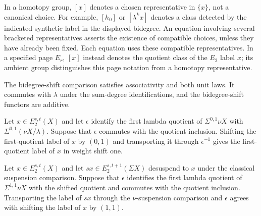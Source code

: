 In a homotopy group, $[x]$ denotes a chosen representative in $\{x\}$,
not a canonical choice. For example, $[h_0]$ or $[\lambda^kx]$ denotes a
class detected by the indicated synthetic label in the displayed
bidegree. An equation involving several bracketed representatives
asserts the existence of compatible choices, unless they have already
been fixed. Each equation uses these compatible representatives. In a specified page $E_r$, $[x]$ instead denotes the
quotient class of the $E_2$ label $x$; its ambient group distinguishes
this page notation from a homotopy representative.


\begin{theorem}
\label{sem:AdamsSynthetic:shift-coherence}
The bidegree-shift comparison satisfies associativity and both unit laws. It commutes with $\lambda$ under the sum-degree identifications, and the bidegree-shift functors are additive.
\end{theorem}

\begin{theorem}
\label{sem:AdamsSynthetic:first-quotient-shifts}
\label{sem:AdamsSynthetic:first-quotient-positive-weight-shift}
Let $x\in E_2^{s,t}(X)$ and let $\epsilon$ identify the first lambda quotient of $\Sigma^{0,1}\nu X$ with $\Sigma^{0,1}(\nu X/\lambda)$. Suppose that $\epsilon$ commutes with the quotient inclusion. Shifting the first-quotient label of $x$ by $(0,1)$ and transporting it through $\epsilon^{-1}$ gives the first-quotient label of $x$ in weight shift one.

\label{sem:AdamsSynthetic:first-quotient-classical-suspension}
Let $x\in E_2^{s,t}(X)$ and let $sx\in E_2^{s,t+1}(\Sigma X)$ desuspend to $x$ under the classical suspension comparison. Suppose that $\epsilon$ identifies the first lambda quotient of $\Sigma^{1,1}\nu X$ with the shifted quotient and commutes with the quotient inclusion. Transporting the label of $sx$ through the $\nu$-suspension comparison and $\epsilon$ agrees with shifting the label of $x$ by $(1,1)$.
\end{theorem}


